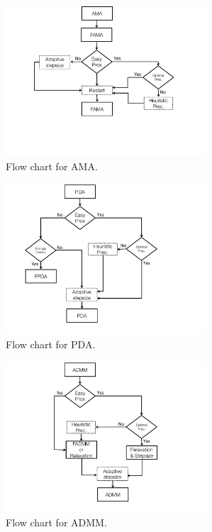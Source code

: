 \documentclass[openany]{now}
\begin{document}
\begin{figure}
        \centering
        \includegraphics[width=75mm,scale=0.75]{Figures/FlowChartAMA}
        \caption{Flow chart for AMA. }
        \label{fig:flowChartAMA}
\end{figure}
\begin{figure}
        \centering
        \includegraphics[width=75mm,scale=0.75]{Figures/FlowChartPDA}
        \caption{Flow chart for PDA. }
        \label{fig:flowChartPDA}
\end{figure}
\begin{figure}
        \centering
        \includegraphics[width=75mm,scale=0.75]{Figures/FlowChartADMM}
        \caption{Flow chart for ADMM. }
        \label{fig:flowChartADMM}
\end{figure}



\appendix
\end{document}

